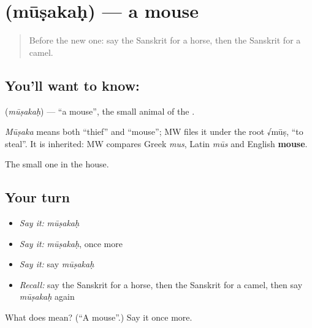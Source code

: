 \section[\texorpdfstring{\sk{मूषकः} (mūṣakaḥ)}{मूषकः (mūṣakaḥ)}]{ (mūṣakaḥ) — a mouse}

\label{lesson:SA-C79-mouse}



\begin{quote}
Before the new one: say the Sanskrit for a horse, then the Sanskrit for a camel.
\end{quote}

\subsection*{You'll want to know: }
\textbf{} (\emph{mūṣakaḥ}) — \textquotedblleft{}a mouse\textquotedblright{}, the small animal of the \textbf{}.

\begin{cousinweb}
\emph{Mūṣaka} means both \textquotedblleft{}thief\textquotedblright{} and \textquotedblleft{}mouse\textquotedblright{}; MW files it under the root √mūṣ, \textquotedblleft{}to steal\textquotedblright{}. It is inherited: MW compares Greek \emph{mus}, Latin \emph{mūs} and English \textbf{mouse}.
\end{cousinweb}

\begin{grammarlens}[title={What you've built}]
The small one in the house.
\end{grammarlens}

\subsection*{Your turn}
\begin{itemize}
\raggedright
  \item \emph{Say it:} \emph{mūṣakaḥ}
  \item \emph{Say it:} \emph{mūṣakaḥ}, once more
  \item \emph{Say it:} say \emph{mūṣakaḥ}
  \item \emph{Recall:} say the Sanskrit for a horse, then the Sanskrit for a camel, then say \emph{mūṣakaḥ} again
\end{itemize}

\begin{tcolorbox}[breakable,colback=teal!4,colframe=teal!35!black,title={Before you move on}]
What does  mean? (\textquotedblleft{}A mouse\textquotedblright{}.) Say it once more.
\end{tcolorbox}
